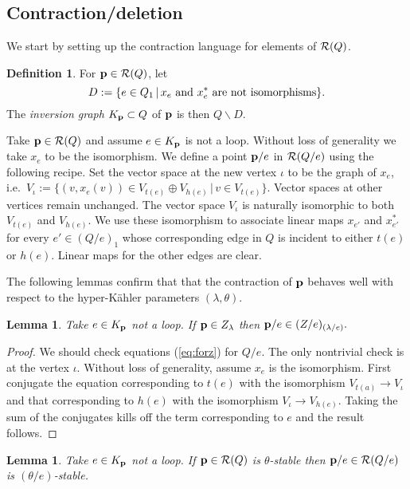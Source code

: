 \documentclass{amsart}
\newtheorem{lem}[thm]{Lemma}
\theoremstyle{definition}
\newtheorem{defn}[thm]{Definition}
\begin{document}
\subsection{Contraction/deletion}
We start by setting up the contraction language for elements of $\mathcal{R}(Q)$.

\begin{defn}
For $\mathbf{p} \in \mathcal{R}(Q)$, let $$D:=\{e\in Q_1 \,|\, x_e \textup{ and } x_e^* \textup{ are not isomorphisms}\}.$$   
The {\em inversion graph} $K_{\mathbf{p}} \subset Q$ of $\mathbf{p}$ is then $Q \backslash D$.
\end{defn}

Take $\mathbf{p} \in \mathcal{R}(Q)$ and assume $e\in K_{\mathbf{p}}$ is not a loop.
Without loss of generality we take $x_e$ to be the isomorphism.
We define a point $\mathbf{p}/e$ in $\mathcal{R}(Q/e)$ using the following recipe.
Set the vector space at the new vertex $\iota$ to be the graph of $x_e$, i.e.\ $V_\iota := \{(v, x_e(v)) \in V_{t(e)} \oplus V_{h(e)} \, | \, v \in V_{t(e)}\}$.
Vector spaces at other vertices remain unchanged.
The vector space $V_\iota$ is naturally isomorphic to both $V_{t(e)}$ and $V_{h(e)}$.
We use these isomorphism to associate linear maps $x_{e'}$ and $x_{e'}^*$ for every $e' \in (Q/e)_1$ whose corresponding edge in $Q$ is incident to either $t(e)$ or $h(e)$.
Linear maps for the other edges are clear.

The following lemmas confirm that that the contraction of $\mathbf{p}$ behaves well with respect to the hyper-K\"ahler parameters $(\lambda, \theta)$.

\begin{lem}\label{lm:contralambda}
Take $e \in K_{\mathbf{p}}$ not a loop. If $\mathbf{p} \in Z_\lambda$ then $\mathbf{p}/e \in (Z/e)_{(\lambda/e)}.$
\end{lem}

\begin{proof}
We should check equations (\ref{eq:forz}) for $Q/e$.
The only nontrivial check is at the vertex $\iota$.
Without loss of generality, assume $x_e$ is the isomorphism.
First conjugate the equation corresponding to $t(e)$ with the isomorphism $V_{t(a)} \rightarrow V_\iota$ and that corresponding to $h(e)$ with the isomorphism $V_\iota \rightarrow V_{h(e)}$.
Taking the sum of the conjugates kills off the term corresponding to $e$ and the result follows.
\end{proof}

\begin{lem}\label{lem:contraction preserves stability}
Take $e\in K_{\mathbf{p}}$ not a loop. If $\mathbf{p} \in \mathcal{R}(Q)$ is $\theta$-stable then $\mathbf{p}/e \in \mathcal{R}(Q/e)$ is $(\theta/e)$-stable.
\end{lem}
\end{document}
